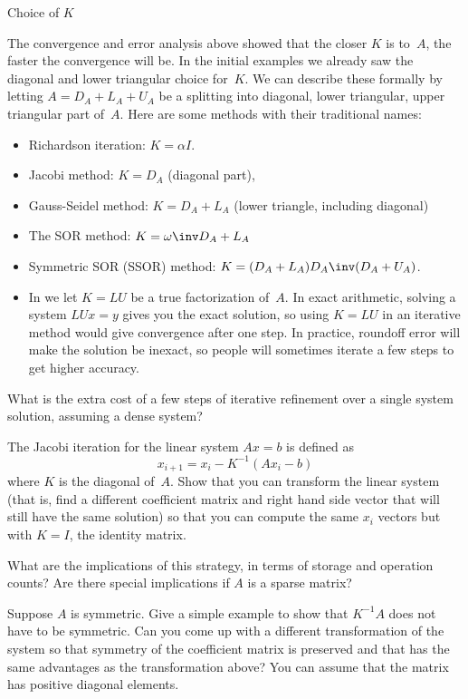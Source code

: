  {Choice of $K$}
\label{sec:preconditioner}

The convergence and error analysis above showed that the closer $K$ is
to~$A$, the faster the  convergence will be.
%
In the initial examples we already saw the diagonal and lower
triangular choice for~$K$. We can describe these formally by letting
$A=D_A+L_A+U_A$ be a splitting into diagonal, lower triangular, upper
triangular part of~$A$. Here are some methods with their traditional names:
\begin{itemize}
\item Richardson iteration: $K=\alpha I$.
\item Jacobi method: $K=D_A$ (diagonal part),
\item Gauss-Seidel method: $K=D_A+L_A$ (lower triangle, including
  diagonal)
\item The \ac{SOR} method: $K=\omega\inv D_A+ L_A$
\item Symmetric SOR (SSOR) method: $K=(D_A+L_A)D_A\inv(D_A+U_A)$.
\item In  we let $K=LU$ be
  a true factorization of~$A$. In exact arithmetic, solving a
  system $LUx=y$ gives you the exact solution, so using $K=LU$ in an
  iterative method would give convergence after one step. In practice,
  roundoff error will make the solution be inexact, so people will
  sometimes iterate a few steps to get higher accuracy.
\end{itemize}
\begin{exercise}
  What is the extra cost of a few steps of iterative refinement over a
  single system solution, assuming a dense system?
\end{exercise}

\begin{exercise}
  The Jacobi iteration for the linear system $Ax=b$ is defined as
\[ x_{i+1}=x_i-K^{-1}(Ax_i-b) \]
where $K$ is the diagonal of~$A$. Show that you can transform the
linear system (that is, find a different coefficient matrix and right
hand side vector that will still have the same solution) so that you
can compute the same $x_i$ vectors but with $K=I$, the identity
matrix.

What are the implications of this strategy, in terms of storage and
operation counts? Are there special implications if $A$ is a sparse
matrix?

Suppose $A$ is symmetric. Give a simple example to show that $K^{-1}A$
does not have to be symmetric. Can you come up with a different
transformation of the system so that symmetry of the coefficient
matrix is preserved and that
has the same advantages as the transformation above? You can
assume that the matrix has positive diagonal elements.
\end{exercise}

